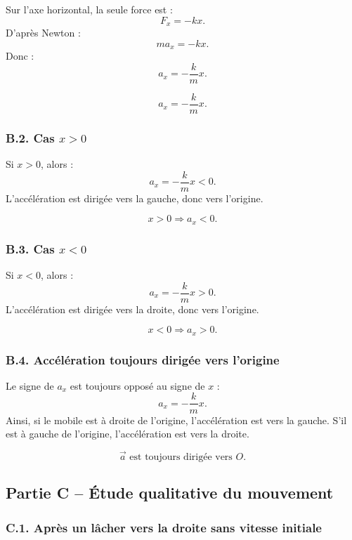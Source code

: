 \documentclass[11pt,a4paper]{article}
\begin{document}
Sur l'axe horizontal, la seule force est :
\[
F_x=-kx.
\]
D'après Newton :
\[
ma_x=-kx.
\]
Donc :
\[
a_x=-\frac{k}{m}x.
\]

\begin{resultatbox}
\[
\boxed{a_x=-\frac{k}{m}x.}
\]
\end{resultatbox}

\subsubsection*{B.2. Cas $x>0$}

Si $x>0$, alors :
\[
a_x=-\frac{k}{m}x<0.
\]
L'accélération est dirigée vers la gauche, donc vers l'origine.

\begin{resultatbox}
\[
\boxed{x>0 \Longrightarrow a_x<0.}
\]
\end{resultatbox}

\subsubsection*{B.3. Cas $x<0$}

Si $x<0$, alors :
\[
a_x=-\frac{k}{m}x>0.
\]
L'accélération est dirigée vers la droite, donc vers l'origine.

\begin{resultatbox}
\[
\boxed{x<0 \Longrightarrow a_x>0.}
\]
\end{resultatbox}

\subsubsection*{B.4. Accélération toujours dirigée vers l'origine}

Le signe de $a_x$ est toujours opposé au signe de $x$ :
\[
a_x=-\frac{k}{m}x.
\]
Ainsi, si le mobile est à droite de l'origine, l'accélération est vers la gauche.
S'il est à gauche de l'origine, l'accélération est vers la droite.

\begin{resultatbox}
\[
\boxed{\vec a \text{ est toujours dirigée vers } O.}
\]
\end{resultatbox}

\subsection{Partie C -- Étude qualitative du mouvement}

\subsubsection*{C.1. Après un lâcher vers la droite sans vitesse initiale}
\end{document}
